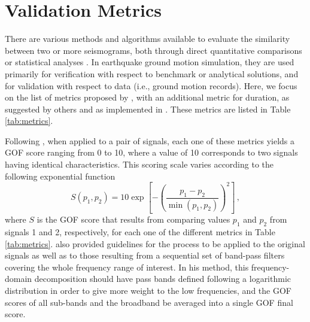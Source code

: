 
\section{Validation Metrics} 
\label{sec:validation-metrics}

There are various methods and algorithms available to evaluate the similarity between two or more seismograms, both through direct  quantitative comparisons or  statistical analyses \citep[e.g.,][]{Anderson_2004_Proc, Kristekova_2006_BSSA, Kristekova_2009_GJI, Olsen_2010_SRL, Burks_BSSA_2014, Rezaeian_2015_BSSA}. In earthquake ground motion simulation, they are used primarily for verification with respect to benchmark or analytical solutions, and for validation with respect to data (i.e., ground motion records). Here, we focus on the list of metrics proposed by \citet{Anderson_2004_Proc}, with an additional metric for duration, as suggested by others \citep{Olsen_2010_SRL, Maufroy_2015_BSSA} and as implemented in \citet{Taborda_2013_BSSA}. These metrics are listed in Table \ref{tab:metrics}.



Following \citet{Anderson_2004_Proc}, when applied to a pair of signals, each one of these metrics yields a GOF score ranging from 0 to 10, where a value of 10 corresponds to two signals having identical characteristics. This scoring scale varies according to the following exponential function
% 
\begin{equation}
\label{eq:gof-function}
	S \left( p_1, p_2 \right) = 10 \exp{ \left[ - \left( \frac{p_1 - p_2}{ \min\left( p_1, p_2 \right) } \right)^2 \right] }
	\, ,
\end{equation}
% 
\noindent
where $S$ is the GOF score that results from comparing values $p_1$ and $p_2$ from signals 1 and 2, respectively, for each one of the different metrics in Table \ref{tab:metrics}.  \citeauthor{Anderson_2004_Proc} also provided guidelines for the process to be applied to the original signals as well as to those resulting from a sequential set of band-pass filters covering the whole frequency range of interest. In his method, this frequency-domain decomposition should have pass bands defined following a logarithmic distribution in order to give more weight to the low frequencies, and the GOF scores of all sub-bands and the broadband be averaged into a single GOF final score. 

